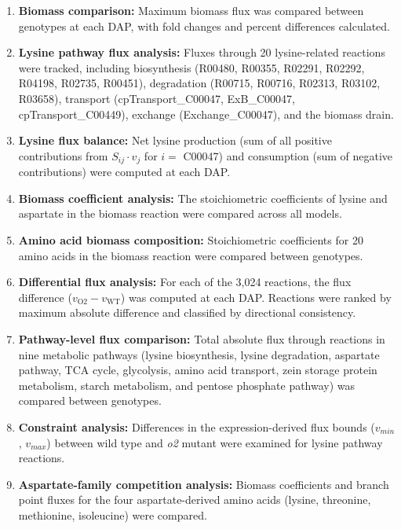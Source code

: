 \documentclass[12pt,a4paper]{article}
\begin{document}
\begin{enumerate}
    \item \textbf{Biomass comparison:} Maximum biomass flux was compared between genotypes at each DAP, with fold changes and percent differences calculated.
    
    \item \textbf{Lysine pathway flux analysis:} Fluxes through 20 lysine-related reactions were tracked, including biosynthesis (R00480, R00355, R02291, R02292, R04198, R02735, R00451), degradation (R00715, R00716, R02313, R03102, R03658), transport (cpTransport\_C00047, ExB\_C00047, cpTransport\_C00449), exchange (Exchange\_C00047), and the biomass drain.
    
    \item \textbf{Lysine flux balance:} Net lysine production (sum of all positive contributions from $S_{ij} \cdot v_j$ for $i = $ C00047) and consumption (sum of negative contributions) were computed at each DAP.
    
    \item \textbf{Biomass coefficient analysis:} The stoichiometric coefficients of lysine and aspartate in the biomass reaction were compared across all models.
    
    \item \textbf{Amino acid biomass composition:} Stoichiometric coefficients for 20 amino acids in the biomass reaction were compared between genotypes.
    
    \item \textbf{Differential flux analysis:} For each of the 3,024 reactions, the flux difference ($v_{\text{O2}} - v_{\text{WT}}$) was computed at each DAP. Reactions were ranked by maximum absolute difference and classified by directional consistency.
    
    \item \textbf{Pathway-level flux comparison:} Total absolute flux through reactions in nine metabolic pathways (lysine biosynthesis, lysine degradation, aspartate pathway, TCA cycle, glycolysis, amino acid transport, zein storage protein metabolism, starch metabolism, and pentose phosphate pathway) was compared between genotypes.
    
    \item \textbf{Constraint analysis:} Differences in the expression-derived flux bounds ($v_{min}$, $v_{max}$) between wild type and \textit{o2} mutant were examined for lysine pathway reactions.
    
    \item \textbf{Aspartate-family competition analysis:} Biomass coefficients and branch point fluxes for the four aspartate-derived amino acids (lysine, threonine, methionine, isoleucine) were compared.
    

\end{enumerate}
\end{document}
